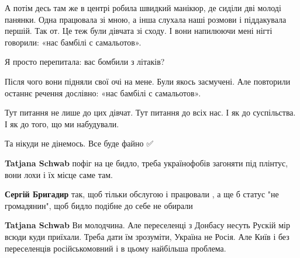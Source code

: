 \begin{itemize}
А потім десь там же в центрі робила швидкий манікюр, де сиділи дві молоді
панянки. Одна працювала зі мною, а інша слухала наші розмови і піддакувала
першій. Так от. Це теж були дівчата зі сходу. І вони напилюючи мені нігті
говорили: «нас бамбілі с самальотов».

Я просто перепитала: вас бомбили з літаків?

Після чого вони підняли свої очі на мене. Були якось засмучені. Але повторили
останнє речення дослівно: «нас бамбілі с самальотов».

Тут питання не лише до цих дівчат. Тут питання до всіх нас. І як до
суспільства. І як до того, що ми набудували.

Та нікуди не дінемось. Все буде файно ✅

\begin{itemize}
 
\textbf{Tatjana Schwab} пофіг на це бидло, треба українофобів загоняти під плінтус, вони лохи і їх місце саме там.

 
\textbf{Сергій Бригадир} так, щоб тільки обслугою і працювали , а ще б статус "не громадянин", щоб бидло подібне до себе не обирали

 
\textbf{Tatjana Schwab} Ви молодчина. Але переселенці з Донбасу несуть Рускій мір всюди куди приїхали. Треба дати їм зрозуміти, Україна не Росія. Але Київ і без переселенців російськомовний і в цьому найбільша проблема.

 

\end{itemize}
\end{itemize}
